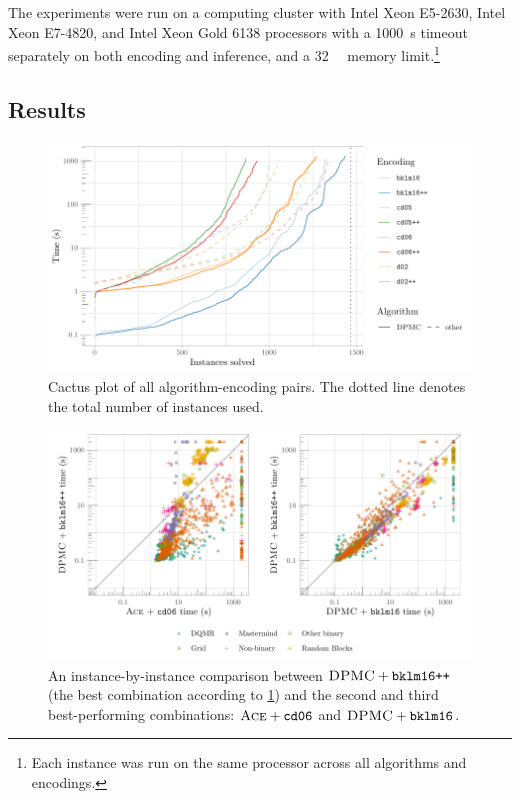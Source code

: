 The experiments were run on a computing cluster with Intel Xeon E5-2630,
Intel Xeon E7-4820, and Intel Xeon Gold 6138 processors with a
\SI{1000}{\second} timeout separately on both encoding and inference, and a
\SI{32}{\gibi\byte} memory limit.\footnote{Each instance was run on the same
  processor across all algorithms and encodings.}

\subsection{Results}

\begin{figure}[t]
  \centering
  \includegraphics[width=\textwidth]{chapters/wmc_without_parameters/cumulative}
  \caption{Cactus plot of all algorithm-encoding pairs. The dotted line denotes
    the total number of instances used.}\label{fig:cumulative2}
\end{figure}

\begin{figure}[t]
  \centering
  \includegraphics[width=\textwidth]{chapters/wmc_without_parameters/scatter}
  \caption{An instance-by-instance comparison between $\textsc{DPMC} +
    \texttt{bklm16++}$ (the best combination according to \cref{fig:cumulative2})
  and the second and third best-performing combinations: $\textsc{Ace} +
  \texttt{cd06}$ and $\textsc{DPMC} + \texttt{bklm16}$.}\label{fig:scatter2}
\end{figure}

